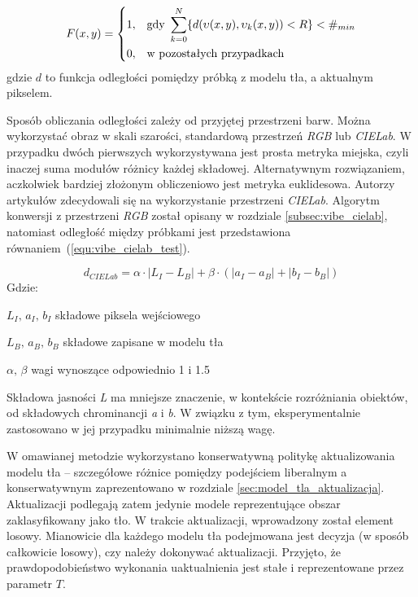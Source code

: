 	\begin{equation}
	    F(x,y) = 
		\begin{dcases}
    		1, & \text{gdy } \sum_{k=0}^{N} \{ d(\upsilon(x,y), \upsilon_k(x,y)) < R \} < \#_{min} \\
    		0, & \text{w pozostałych przypadkach} 
		\end{dcases}
	\label{equ:vibe_test}	
	\end{equation}
\noindent gdzie $d$ to funkcja odległości pomiędzy próbką z modelu tła, a aktualnym pikselem.

Sposób obliczania odległości zależy od przyjętej przestrzeni barw. 
Można wykorzystać obraz w skali szarości, standardową przestrzeń \textit{RGB} lub \textit{CIELab}. 
W przypadku dwóch pierwszych wykorzystywana jest prosta metryka miejska, czyli inaczej suma modułów różnicy każdej składowej. 
Alternatywnym rozwiązaniem, aczkolwiek bardziej złożonym obliczeniowo jest metryka euklidesowa. 
Autorzy artykułów \cite{kryjak_14_vibe, kryjak_13_vibe} zdecydowali się na wykorzystanie przestrzeni \textit{CIELab}. Algorytm konwersji z przestrzeni \textit{RGB} został opisany w rozdziale \ref{subsec:vibe_cielab}, natomiast odległość między próbkami jest przedstawiona równaniem~(\ref{equ:vibe_cielab_test}).

	\begin{equation}
	    d_{CIELab} = \alpha \cdot |L_I - L_B| + \beta \cdot (| a_I - a_B | + | b_I - b_B |)
	\label{equ:vibe_cielab_test}
	\end{equation}
Gdzie:
\begin{eqwhere}[2.6cm]
	\item[$L_I,\, a_I,\, b_I$] składowe piksela wejściowego
	\item[$L_B,\, a_B,\, b_B$] składowe zapisane w modelu tła
	\item[$\alpha,\, \beta$] wagi wynoszące odpowiednio \num{1} i \num{1.5}
\end{eqwhere}


\noindent Składowa jasności \textit{L} ma mniejsze znaczenie, w kontekście rozróżniania obiektów, od składowych chrominancji \textit{a} i \textit{b}. W związku z tym, eksperymentalnie zastosowano w jej przypadku minimalnie niższą wagę.  

W omawianej metodzie wykorzystano konserwatywną politykę aktualizowania modelu tła -- szczegółowe różnice pomiędzy podejściem liberalnym a konserwatywnym zaprezentowano w rozdziale \ref{sec:model_tla_aktualizacja}. 
Aktualizacji podlegają zatem jedynie modele reprezentujące obszar zaklasyfikowany jako tło.
W trakcie aktualizacji, wprowadzony został element losowy. Mianowicie dla każdego modelu tła podejmowana jest decyzja (w sposób całkowicie losowy), czy należy dokonywać aktualizacji. 
Przyjęto, że prawdopodobieństwo wykonania uaktualnienia jest stałe i reprezentowane przez parametr $T$. 

